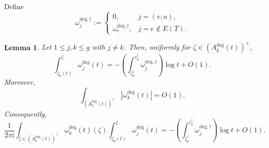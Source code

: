 \documentclass[12pt]{amsart}
\numberwithin{equation}{section}
\newtheorem{lemma}[theorem]{Lemma}
\theoremstyle{definition}
\def\edges{E}
\def\trop{\dagger}
\def\imunit{{\mathrm{i}}}
\def\ptSig{\zeta}
\def\basept{{\ptSig_0}}
\def\baseptT{{\ptSig_0^\trop}}
\begin{document}
Define
\[
\omega_j^{\mathrm{deg},\trop}
:=
\begin{cases}
0,
&
j=(v,a),
\\
\omega_e^{\mathrm{deg},\trop},
&
j=e\notin\edges(T).
\end{cases}
\]


\begin{lemma}
\label{lem:uniform_A_cycle_asymptotics}
Let $1\leq j,k\leq g$ with $j\neq k$. Then, uniformly for
$\zeta\in(A_k^{\mathrm{deg}}(t))^+$,
\begin{equation}
\label{eq:uniform_A_cycle_asymptotics_first}
\int_{\basept(t)}^\zeta
\omega_j^{\mathrm{deg}}(t)
=
-
\left(
\int_{\baseptT}^{\tau_k^\trop}
\omega_j^{\mathrm{deg},\trop}
\right)
\log t
+
O(1).
\end{equation}
Moreover,
\[
\int_{(A_k^{\mathrm{deg}}(t))^+}
\left|
\omega_k^{\mathrm{deg}}(t)
\right|
=
O(1).
\]
Consequently,
\[
\frac{1}{2\pi\imunit}
\int_{\zeta\in(A_k^{\mathrm{deg}}(t))^+}
\omega_k^{\mathrm{deg}}(t)(\zeta)
\int_{\basept(t)}^\zeta
\omega_j^{\mathrm{deg}}(t)
=
-
\left(
\int_{\baseptT}^{\tau_k^\trop}
\omega_j^{\mathrm{deg},\trop}
\right)
\log t
+
O(1).
\]
\end{lemma}
\end{document}
